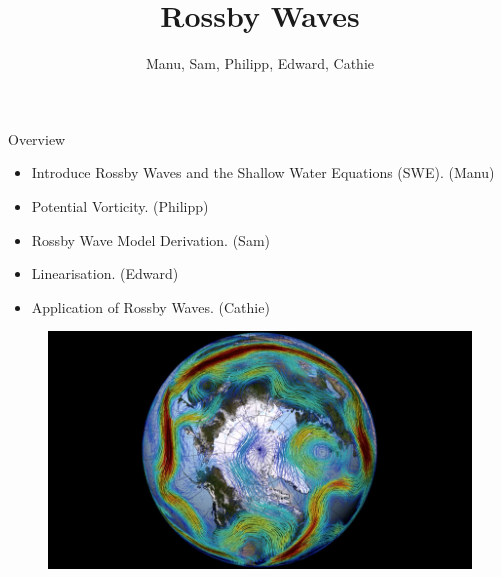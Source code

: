 \documentclass[12pt]{beamer}
\title[Rossby Waves]{Rossby Waves}
\author{Manu, Sam, Philipp, Edward, Cathie}
\institute{University of Reading and Imperial College London}
\begin{document}
	
	\begin{frame}
	\titlepage
\end{frame}

\begin{frame}{Overview}

\begin{itemize}
	\item Introduce Rossby Waves and the Shallow Water Equations (SWE). (Manu)
	\item Potential Vorticity. (Philipp)
	\item Rossby Wave Model Derivation. (Sam)
	\item Linearisation. (Edward)
	\item Application of Rossby Waves. (Cathie)
\end{itemize}

\begin{figure}[H]
	\centering
	\includegraphics[width=0.5\linewidth]{Rossby_Wave.jpg}
\end{figure}   

\end{frame}
\end{document}
